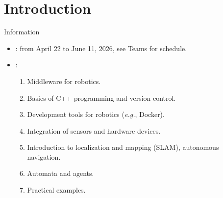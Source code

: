 
\section{Introduction}
\graphicspath{{figs/section1/}}

\begin{frame}{Information}
  \justifying
	\begin{itemize}
		\item {}: from April 22 to June 11, 2026, see Teams for schedule.
		\item {}:
		      \begin{enumerate}
			      \item Middleware for robotics.
			      \item Basics of C++ programming and version control.
			      \item Development tools for robotics (\emph{e.g.}, Docker).
			      \item Integration of sensors and hardware devices.
			      \item Introduction to localization and mapping (SLAM), autonomous navigation.
			      \item Automata and agents.
			      \item Practical examples.
		      \end{enumerate}
	\end{itemize}
\end{frame}
